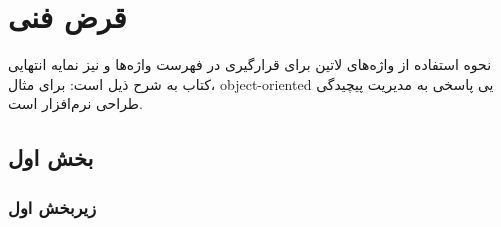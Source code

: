 \chapter{قرض فنی} \label{ch:1}

نحوه استفاده از واژه‌های لاتین برای قرارگیری در فهرست واژه‌ها و نیز نمایه انتهایی کتاب به شرح ذیل است: 
برای مثال، 
\gls{object-oriented}%
یی
 پاسخی به مدیریت پیچیدگی طراحی نرم‌افزار است. 


\section{بخش اول}

\subsection{زیربخش اول}

